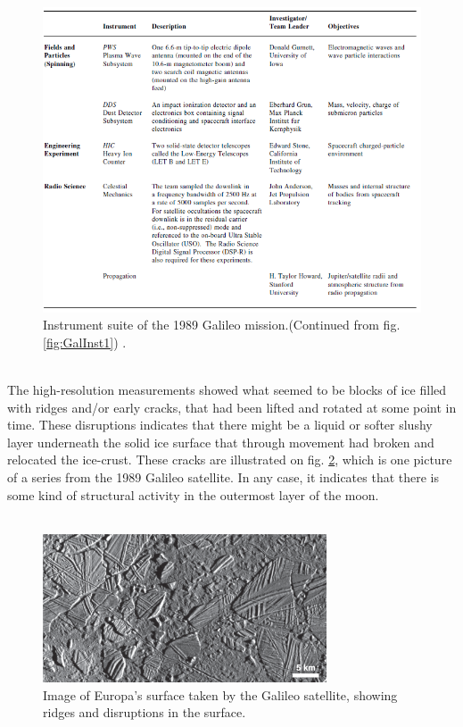 \begin{figure}[htb]
	\centering
	\includegraphics[width=\textwidth]{figures/Rasmus/GalileoInstrument2}
	\caption{Instrument suite of the 1989 Galileo mission.(Continued from fig. \ref{fig:GalInst1}) \cite{SciStrat} .\label{fig:GalInst2}}
\end{figure}
\fi
\\
The high-resolution measurements showed what seemed to be blocks of ice filled with ridges and/or early cracks, that had been lifted and rotated at some point in time. These disruptions indicates that there might be a liquid or softer slushy layer underneath the solid ice surface that through movement had broken and relocated the ice-crust. These cracks are illustrated on fig. \ref{fig:SurfCrack}, which is one picture of a series from the 1989 Galileo satellite\cite{HidOcean}. In any case, it indicates that there is some kind of structural activity in the outermost layer of the moon.\\
\\

\begin{figure}[htb]
	\centering
	\includegraphics[width=0.75\textwidth]{figures/Orbiter/chaos.png}
	\caption{Image of Europa's surface taken by the Galileo satellite, showing ridges and disruptions in the surface. \label{fig:SurfCrack}\cite{HidOcean}}
\end{figure}

